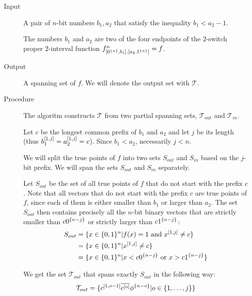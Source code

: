 \begin{description}
\item[Input] A pair of $n$-bit numbers $b_1, a_2$ that satisfy the inequality $b_1 < a_2 - 1$.

The numbers $b_1$ and $a_2$
are two of the four endpoints
of the $2$-switch proper
$2$-interval
function $f^{n}_{[0^{\{n\}}, b_1], [a_2, 1^{\{n\}}]} = f$.

\item[Output] A spanning set of $f$.
We will denote the output set with $\mathcal{T}$.

\item[Procedure]
The algoritm constructs $\mathcal{T}$ from two partial spanning sets, $\mathcal{T}_{out}$ and $\mathcal{T}_{in}$.

Let $c$ be the longest common prefix of $b_1$ and $a_2$
and let $j$ be its length
(thus $b_1^{[1, j]} = a_2^{[1, j]} = c$).
Since $b_1 < a_2$, necessarily $j < n$.

We will split the true points of $f$
into two sets $S_{out}$ and $S_{in}$
based on the $j$-bit prefix.
We will span the sets $S_{out}$ and $S_{in}$ separately.

Let $S_{out}$ be the set of all true points of $f$
that do not start with the prefix $c$.
Note that all vectors
that do not start with the prefix $c$
are true points of $f$,
since each of them is either smaller than $b_1$
or larger than $a_2$.
The set $S_{out}$ then contains precisely
all the $n$-bit binary vectors
that are strictly smaller than $c 0^{\{n-j\}}$
or strictly larger than $c 1^{\{n-j\}}$:
\begin{align*}
S_{out}
&= \{x \in \{0, 1\}^n
| f(x) = 1 \text{ and } x^{[1, j]} \neq c\} \\
&= \{x \in \{0, 1\}^n
| x^{[1, j]} \neq c\} \\
&= \{x \in \{0, 1\}^n
| x < c 0^{\{n-j\}} \text{ or } x > c 1^{\{n-j\}}\}
\end{align*}

We get the set $\mathcal{T}_{out}$ that spans exactly
$S_{out}$
in the following way:
$$
\mathcal{T}_{out} = \{c^{[1, o-1]} \overline{c^{[o]}} \phi^{\{n-o\}} | o \in \{1, \ldots, j\}\}
$$



\end{description}
